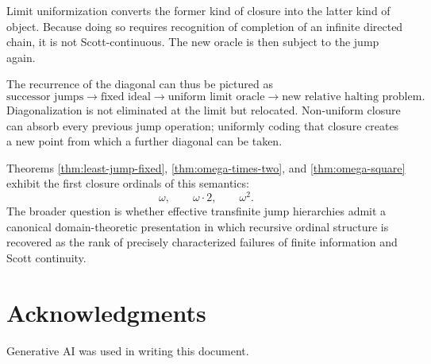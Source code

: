 \documentclass[11pt]{article}
\theoremstyle{definition}
\theoremstyle{remark}
\begin{document}
Limit uniformization converts the former kind of closure into the latter kind of object. Because doing so requires recognition of completion of an infinite directed chain, it is not Scott-continuous. The new oracle is then subject to the jump again.

The recurrence of the diagonal can thus be pictured as
\[
\text{successor jumps}
\longrightarrow
\text{fixed ideal}
\longrightarrow
\text{uniform limit oracle}
\longrightarrow
\text{new relative halting problem}.
\]
Diagonalization is not eliminated at the limit but relocated. Non-uniform closure can absorb every previous jump operation; uniformly coding that closure creates a new point from which a further diagonal can be taken.

Theorems \ref{thm:least-jump-fixed}, \ref{thm:omega-times-two}, and \ref{thm:omega-square} exhibit the first closure ordinals of this semantics:
\[
\omega,
\qquad
\omega\cdot2,
\qquad
\omega^2.
\]
The broader question is whether effective transfinite jump hierarchies admit a canonical domain-theoretic presentation in which recursive ordinal structure is recovered as the rank of precisely characterized failures of finite information and Scott continuity.

\section*{Acknowledgments}
Generative AI was used in writing this document.
\end{document}
